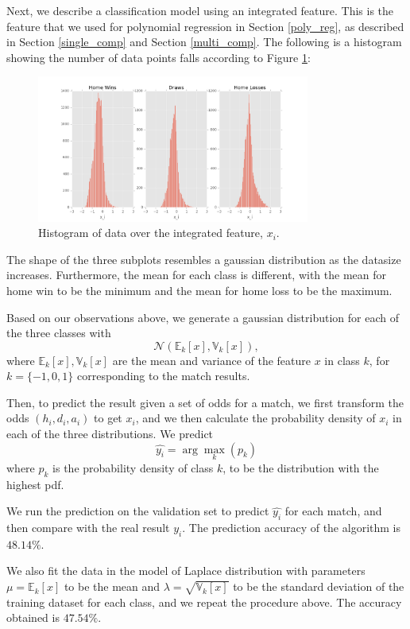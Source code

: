 \documentclass{article}
\begin{document}
Next, we describe a classification model using an integrated feature. This is the feature that we used for polynomial regression in Section \ref{poly_reg}, as described in Section \ref{single_comp} and Section \ref{multi_comp}. The following is a histogram showing the number of data points falls according to Figure \ref*{fig_integrated}:
\begin{figure}[!ht]
	\centering
	\includegraphics[width=0.8\textwidth]{1D_all.png}
	\caption{Histogram of data over the integrated feature, $x_i$.}
	\label{fig_integrated}
\end{figure}

The shape of the three subplots resembles a gaussian distribution as the datasize increases. Furthermore, the mean for each class is different, with the mean for home win to be the minimum and the mean for home loss to be the maximum.

Based on our observations above, we generate a gaussian distribution for each of the three classes with \[
\mathcal{N} (\mathbb{E}_k[x], \mathbb{V}_k[x]),
\] where $\mathbb{E}_k[x], \mathbb{V}_k[x]$ are the mean and variance of the feature $x$ in class $k$, for $k = \{-1, 0, 1\}$ corresponding to the match results.

Then, to predict the result given a set of odds for a match, we first transform the odds $(h_i, d_i, a_i)$ to get $x_i$, and we then calculate the probability density of $x_i$ in each of the three distributions. We predict \[
\hat{y_i} = \arg\max_k(p_k)
\] where $p_k$ is the probability density of class $k$, to be the distribution with the highest pdf.

We run the prediction on the validation set to predict $\hat{y_i}$ for each match, and then compare with the real result $y_i$. The prediction accuracy of the algorithm is $48.14 \%$.

We also fit the data in the model of Laplace distribution with parameters $\mu = 
\mathbb{E}_k[x]$ to be the mean and $\lambda = \sqrt{\mathbb{V}_k[x]}$ to be the standard deviation of the training dataset for each class, and we repeat the procedure above. The accuracy obtained is $47.54\%$.
\end{document}
